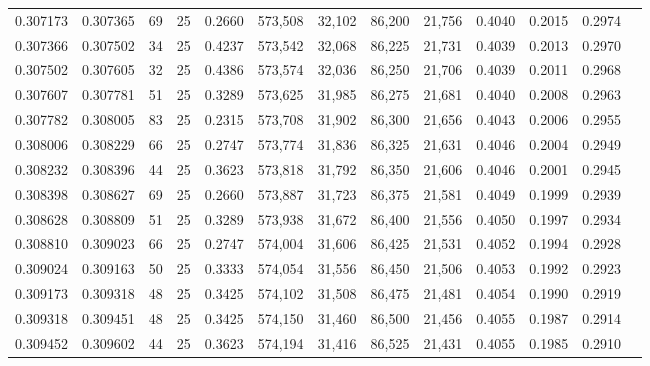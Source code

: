\begin{tabular}{rrrrrrrrrrrrr}
0.307173 & 0.307365 &    69 &  25 &                                     0.2660 & 573,508 &  32,102 &  86,200 &  21,756 & 0.4040 & 0.2015 & 0.2974 \\
0.307366 & 0.307502 &    34 &  25 &                                     0.4237 & 573,542 &  32,068 &  86,225 &  21,731 & 0.4039 & 0.2013 & 0.2970 \\
0.307502 & 0.307605 &    32 &  25 &                                     0.4386 & 573,574 &  32,036 &  86,250 &  21,706 & 0.4039 & 0.2011 & 0.2968 \\
0.307607 & 0.307781 &    51 &  25 &                                     0.3289 & 573,625 &  31,985 &  86,275 &  21,681 & 0.4040 & 0.2008 & 0.2963 \\
0.307782 & 0.308005 &    83 &  25 &                                     0.2315 & 573,708 &  31,902 &  86,300 &  21,656 & 0.4043 & 0.2006 & 0.2955 \\
0.308006 & 0.308229 &    66 &  25 &                                     0.2747 & 573,774 &  31,836 &  86,325 &  21,631 & 0.4046 & 0.2004 & 0.2949 \\
0.308232 & 0.308396 &    44 &  25 &                                     0.3623 & 573,818 &  31,792 &  86,350 &  21,606 & 0.4046 & 0.2001 & 0.2945 \\
0.308398 & 0.308627 &    69 &  25 &                                     0.2660 & 573,887 &  31,723 &  86,375 &  21,581 & 0.4049 & 0.1999 & 0.2939 \\
0.308628 & 0.308809 &    51 &  25 &                                     0.3289 & 573,938 &  31,672 &  86,400 &  21,556 & 0.4050 & 0.1997 & 0.2934 \\
0.308810 & 0.309023 &    66 &  25 &                                     0.2747 & 574,004 &  31,606 &  86,425 &  21,531 & 0.4052 & 0.1994 & 0.2928 \\
0.309024 & 0.309163 &    50 &  25 &                                     0.3333 & 574,054 &  31,556 &  86,450 &  21,506 & 0.4053 & 0.1992 & 0.2923 \\
0.309173 & 0.309318 &    48 &  25 &                                     0.3425 & 574,102 &  31,508 &  86,475 &  21,481 & 0.4054 & 0.1990 & 0.2919 \\
0.309318 & 0.309451 &    48 &  25 &                                     0.3425 & 574,150 &  31,460 &  86,500 &  21,456 & 0.4055 & 0.1987 & 0.2914 \\
0.309452 & 0.309602 &    44 &  25 &                                     0.3623 & 574,194 &  31,416 &  86,525 &  21,431 & 0.4055 & 0.1985 & 0.2910 \\

\end{tabular}

